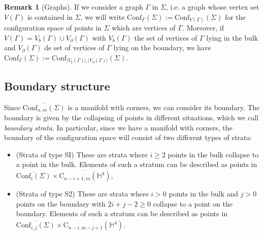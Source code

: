 \documentclass[11pt,colorinlistoftodos]{amsart}
\numberwithin{equation}{subsection}
\theoremstyle{plain}
\theoremstyle{definition}
\newtheorem{rem}[thm]{Remark}
\theoremstyle{remark}
\newcommand{\de}{\partial}
\begin{document}
\begin{rem}[Graphs]
If we consider a graph $\Gamma$ in $\Sigma$, i.e. a graph whose vertex set $V(\Gamma)$ is contained in $\Sigma$, we will write $\mathrm{Conf}_\Gamma(\Sigma):=\mathrm{Conf}_{V(\Gamma)}(\Sigma)$ for the configuration space of points in $\Sigma$ which are vertices of $\Gamma$. Moreover, if $V(\Gamma)=V_b(\Gamma)\cup V_\de(\Gamma)$ with $V_b(\Gamma)$ the set of vertices of $\Gamma$ lying in the bulk and $V_\de(\Gamma)$ de set of vertices of $\Gamma$ lying on the boundary, we have $\mathrm{Conf}_\Gamma(\Sigma):=\mathrm{Conf}_{\vert V_b(\Gamma)\vert,\vert V_\de(\Gamma)\vert}(\Sigma)$.
\end{rem}


\subsection{Boundary structure}
Since $\overline{\mathrm{Conf}_{n,m}(\Sigma)}$ is a manifold with corners, we can consider its boundary. The boundary is given by the collapsing of points in different situations, which we call \emph{boundary strata}. In particular, since we have a manifold with corners, the boundary of the configuration space will consist of two different types of strata:
\begin{itemize}
    \item (Strata of type SI) These are strata where $i\geq 2$ points in the bulk collapse to a point in the bulk. Elements of such a stratum can be described as points in $\overline{\mathrm{Conf}_i(\Sigma)}\times\overline{\mathrm{C}_{n-i+1,m}(\mathbb{H}^4)}$,
    \item (Strata of type S2) These are strata where $i>0$ points in the bulk and $j>0$ points on the boundary with $2i+j-2\geq 0$ collapse to a point on the boundary. Elements of such a stratum can be described as points in $\overline{\mathrm{Conf}_{i,j}(\Sigma)}\times\overline{\mathrm{C}_{n-i,m-j+1}(\mathbb{H}^4)}$.
\end{itemize}


   



\printbibliography
\end{document}
